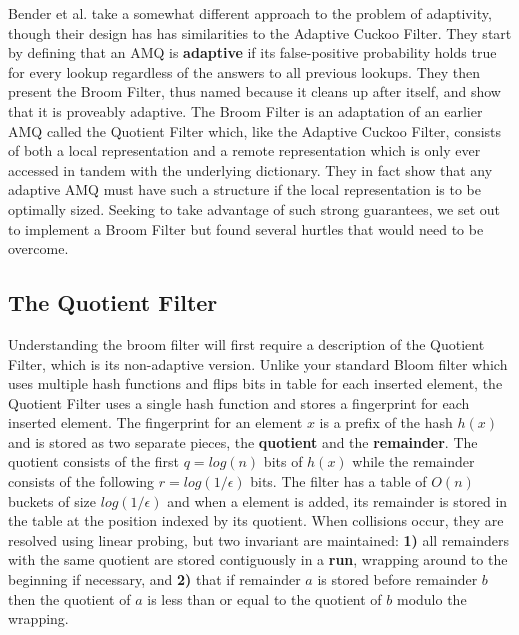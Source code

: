 \documentclass[../paper.tex]{subfiles}
\begin{document}
	Bender et al. \cite{broom-filter} take a somewhat different approach to the problem of adaptivity, though their design has has similarities to the Adaptive Cuckoo Filter.  They start by defining that an AMQ is {\bf adaptive} if its false-positive probability holds true for every lookup regardless of the answers to all previous lookups.  They then present the Broom Filter, thus named because it cleans up after itself, and show that it is proveably adaptive.  The Broom Filter is an adaptation of an earlier AMQ called the Quotient Filter \cite{quotient-filter} which, like the Adaptive Cuckoo Filter, consists of both a local representation and a remote representation which is only ever accessed in tandem with the underlying dictionary.   They in fact show that any adaptive AMQ must have such a structure if the local representation is to be optimally sized.  Seeking to take advantage of such strong guarantees, we set out to implement a Broom Filter but found several hurtles that would need to be overcome.  
	
\subsection{The Quotient Filter}
	Understanding the broom filter will first require a description of the Quotient Filter, which is its non-adaptive version.   Unlike your standard Bloom filter which uses multiple hash functions and flips bits in table for each inserted element, the Quotient Filter uses a single hash function and stores a fingerprint for each inserted element.  The fingerprint for an element $x$ is a prefix of the hash $h(x)$ and is stored as two separate pieces, the {\bf quotient} and the {\bf remainder}.  The quotient consists of the first $q = log(n)$ bits of $h(x)$ while the remainder consists of the following $r = log(1/\epsilon)$ bits.  The filter has a table of $O(n)$ buckets of size $log(1/\epsilon)$ and when a element is added, its remainder is stored in the table at the position indexed by its quotient.  When collisions occur, they are resolved using linear probing, but two invariant are maintained: {\bf 1)} all remainders with the same quotient are stored contiguously in a {\bf run}, wrapping around to the beginning if necessary, and {\bf 2)} that if remainder $a$ is stored before remainder $b$ then the quotient of $a$ is less than or equal to the quotient of $b$ modulo the wrapping.  
\end{document}

